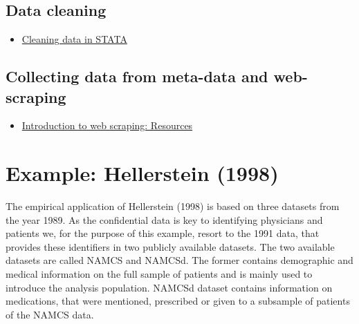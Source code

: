 \documentclass[
]{book}
\providecommand{\tightlist}{%
  \setlength{\itemsep}{0pt}\setlength{\parskip}{0pt}}
\begin{document}
\hypertarget{data-cleaning}{%
\subsection{Data cleaning}\label{data-cleaning}}

\begin{itemize}
\tightlist
\item
  \href{https://mdl.library.utoronto.ca/technology/tutorials/cleaning-data-stata}{Cleaning
  data in STATA}
\end{itemize}

\hypertarget{collecting-data-from-meta-data-and-web-scraping}{%
\subsection{Collecting data from meta-data and
web-scraping}\label{collecting-data-from-meta-data-and-web-scraping}}

\begin{itemize}
\tightlist
\item
  \href{https://librarycarpentry.org/lc-webscraping/reference}{Introduction
  to web scraping: Resources}
\end{itemize}

\hypertarget{example-hellerstein-1998-2}{%
\section{Example: Hellerstein (1998)}\label{example-hellerstein-1998-2}}

The empirical application of Hellerstein (1998) is based on three
datasets from the year 1989. As the confidential data is key to
identifying physicians and patients we, for the purpose of this example,
resort to the 1991 data, that provides these identifiers in two publicly
available datasets. The two available datasets are called NAMCS and
NAMCSd. The former contains demographic and medical information on the
full sample of patients and is mainly used to introduce the analysis
population. NAMCSd dataset contains information on medications, that
were mentioned, prescribed or given to a subsample of patients of the
NAMCS data.
\end{document}
